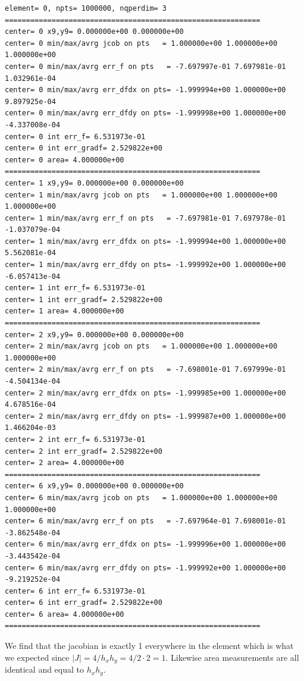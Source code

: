 \begin{tiny}
\begin{verbatim}
element= 0, npts= 1000000, nqperdim= 3
============================================================
center= 0 x9,y9= 0.000000e+00 0.000000e+00 
center= 0 min/max/avrg jcob on pts   = 1.000000e+00 1.000000e+00 1.000000e+00
center= 0 min/max/avrg err_f on pts   = -7.697997e-01 7.697981e-01 1.032961e-04
center= 0 min/max/avrg err_dfdx on pts= -1.999994e+00 1.000000e+00 9.897925e-04
center= 0 min/max/avrg err_dfdy on pts= -1.999998e+00 1.000000e+00 -4.337008e-04
center= 0 int err_f= 6.531973e-01
center= 0 int err_gradf= 2.529822e+00
center= 0 area= 4.000000e+00
============================================================
center= 1 x9,y9= 0.000000e+00 0.000000e+00 
center= 1 min/max/avrg jcob on pts   = 1.000000e+00 1.000000e+00 1.000000e+00
center= 1 min/max/avrg err_f on pts   = -7.697981e-01 7.697978e-01 -1.037079e-04
center= 1 min/max/avrg err_dfdx on pts= -1.999994e+00 1.000000e+00 5.562081e-04
center= 1 min/max/avrg err_dfdy on pts= -1.999992e+00 1.000000e+00 -6.057413e-04
center= 1 int err_f= 6.531973e-01
center= 1 int err_gradf= 2.529822e+00
center= 1 area= 4.000000e+00
============================================================
center= 2 x9,y9= 0.000000e+00 0.000000e+00 
center= 2 min/max/avrg jcob on pts   = 1.000000e+00 1.000000e+00 1.000000e+00
center= 2 min/max/avrg err_f on pts   = -7.698001e-01 7.697999e-01 -4.504134e-04
center= 2 min/max/avrg err_dfdx on pts= -1.999985e+00 1.000000e+00 4.678516e-04
center= 2 min/max/avrg err_dfdy on pts= -1.999987e+00 1.000000e+00 1.466204e-03
center= 2 int err_f= 6.531973e-01
center= 2 int err_gradf= 2.529822e+00
center= 2 area= 4.000000e+00
============================================================
center= 6 x9,y9= 0.000000e+00 0.000000e+00 
center= 6 min/max/avrg jcob on pts   = 1.000000e+00 1.000000e+00 1.000000e+00
center= 6 min/max/avrg err_f on pts   = -7.697964e-01 7.698001e-01 -3.862548e-04
center= 6 min/max/avrg err_dfdx on pts= -1.999996e+00 1.000000e+00 -3.443542e-04
center= 6 min/max/avrg err_dfdy on pts= -1.999992e+00 1.000000e+00 -9.219252e-04
center= 6 int err_f= 6.531973e-01
center= 6 int err_gradf= 2.529822e+00
center= 6 area= 4.000000e+00
============================================================
\end{verbatim}
\end{tiny}

We find that the jacobian is exactly 1 everywhere in the element which 
is what we expected since $|J|=4/h_xh_y=4/2\cdot 2=1$.
Likewise area measurements are all identical and equal to $h_xh_y$.

